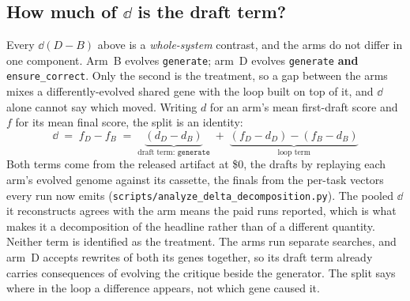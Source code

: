 \documentclass[11pt]{article}
\begin{document}
\subsection{How much of \texorpdfstring{$\dd$}{Delta} is the draft term?}
\label{sec:decomp}

Every $\dd(D-B)$ above is a \emph{whole-system} contrast, and the arms do not differ in one
component. Arm~B evolves \texttt{generate}; arm~D evolves \texttt{generate} \textbf{and}
\texttt{ensure\_correct}. Only the second is the treatment, so a gap between the arms mixes a
differently-evolved shared gene with the loop built on top of it, and $\dd$ alone cannot say
which moved. Writing $d$ for an arm's mean first-draft score and $f$ for its mean final score,
the split is an identity:
\[
\dd \;=\; f_D - f_B \;=\; \underbrace{(d_D - d_B)}_{\text{draft term: }\texttt{generate}}
\;+\; \underbrace{(f_D - d_D) - (f_B - d_B)}_{\text{loop term}}
\]
Both terms come from the released artifact at \$0, the drafts by replaying each arm's evolved
genome against its cassette, the finals from the per-task vectors every run now emits
(\texttt{scripts/analyze\_delta\_decomposition.py}). The pooled $\dd$ it reconstructs agrees
with the arm means the paid runs reported, which is what makes it a decomposition of the
headline rather than of a different quantity. Neither term is identified as the treatment. The
arms run separate searches, and arm~D accepts rewrites of both its genes together, so its draft
term already carries consequences of evolving the critique beside the generator. The split says
where in the loop a difference appears, not which gene caused it.
\end{document}
